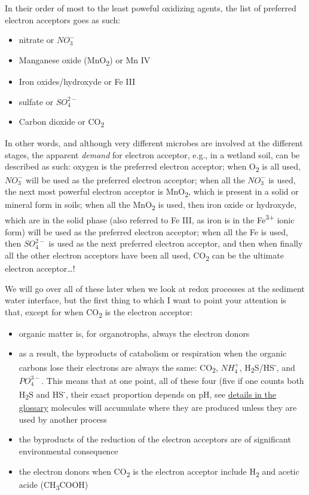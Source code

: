 \documentclass[]{book}
\providecommand{\tightlist}{%
  \setlength{\itemsep}{0pt}\setlength{\parskip}{0pt}}
\theoremstyle{definition}
\theoremstyle{definition}
\theoremstyle{definition}
\theoremstyle{remark}
\begin{document}
In their order of most to the least poweful oxidizing agents, the list
of preferred electron acceptors goes as such:

\begin{itemize}
\tightlist
\item
  nitrate or \(NO_3^-\)
\item
  Manganese oxide (MnO\textsubscript{2}) or Mn IV
\item
  Iron oxides/hydroxyde or Fe III
\item
  sulfate or \(SO_4^{2-}\)
\item
  Carbon dioxide or CO\textsubscript{2}
\end{itemize}

In other words, and although very different microbes are involved at the
different stages, the apparent \emph{demand} for electron acceptor,
e.g., in a wetland soil, can be described as such: oxygen is the
preferred electron acceptor; when O\textsubscript{2} is all used,
\(NO_3^-\) will be used as the preferred electron acceptor; when all the
\(NO_3^-\) is used, the next most powerful electron acceptor is
MnO\textsubscript{2}, which is present in a solid or mineral form in
soils; when all the MnO\textsubscript{2} is used, then iron oxide or
hydroxyde, which are in the solid phase (also referred to Fe III, as
iron is in the Fe\textsuperscript{3+} ionic form) will be used as the
preferred electron acceptor; when all the Fe is used, then \(SO_4^{2-}\)
is used as the next preferred electron acceptor, and then when finally
all the other electron acceptors have been all used, CO\textsubscript{2}
can be the ultimate electron acceptor\ldots{}!

We will go over all of these later when we look at redox processes at
the sediment water interface, but the first thing to which I want to
point your attention is that, except for when CO\textsubscript{2} is the
electron acceptor:

\begin{itemize}
\tightlist
\item
  organic matter is, for organotrophs, always the electron donors
\item
  as a result, the byproducts of catabolism or respiration when the
  organic carbons lose their electrons are always the same:
  CO\textsubscript{2}, \(NH_4^+\),
  H\textsubscript{2}S/HS\textsuperscript{-}, and \(PO_4^{3-}\). This
  means that at one point, all of these four (five if one counts both
  H\textsubscript{2}S and HS\textsuperscript{-}, their exact proportion
  depends on pH, see \protect\hyperlink{hydrogen-sulfide}{details in the
  glossary} molecules will accumulate where they are produced unless
  they are used by another process
\item
  the byproducts of the reduction of the electron acceptors are of
  significant environmental consequence
\item
  the electron donors when CO\textsubscript{2} is the electron acceptor
  include H\textsubscript{2} and acetic acide (CH\textsubscript{3}COOH)
\end{itemize}
\end{document}
